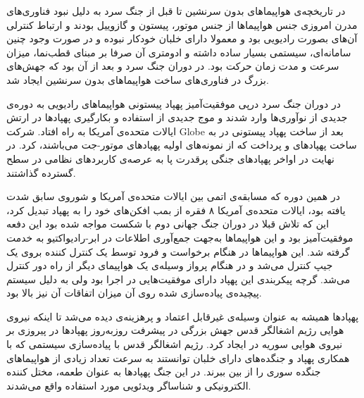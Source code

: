 
در تاریخچه‌ی هواپیماهای بدون سرنشین تا قبل از جنگ سرد به دلیل نبود فناوری‌های مدرن امروزی جنس هواپیماها از جنس موتور، پیستون و گازوییل بودند و ارتباط کنترلی آن‌های بصورت رادیویی بود و معمولا دارای خلبان خودکار نبوده و در صورت وجود چنین سامانه‌ای، سیستمی بسیار ساده داشته و ادومتری آن‌ صرفا بر مبنای قطب‌نما، میزان سرعت و مدت زمان حرکت بود. در دوران جنگ سرد و بعد از آن بود که جهش‌های بزرگ در فناوری‌های ساخت هواپیماهای بدون سرنشین ایجاد شد.

در دوران جنگ سرد درپی موفقیت‌آمیز پهپاد پیستونی  هواپیماهای رادیویی به دوره‌ی جدیدی از نوآوری‌ها وارد شدند و موج جدیدی از استفاده و بکارگیری پهپادها در ارتش ایالات متحده‌ی آمریکا به راه افتاد. شرکت Globe بعد از ساخت پهپاد پیستونی  در  به ساخت پهپادهای  و  پرداخت که از نمونه‌های اولیه پهپادهای موتور-جت می‌باشند، کرد. در نهایت در اواخر  پهپادهای جنگی پرقدرت پا به عرصه‌ی کاربردهای نظامی در سطح گسترده گذاشتند.


در همین دوره که مسابقه‌ی اتمی بین ایالات متحده‌ی آمریکا و شوروی سابق شدت یافته بود، ایالات متحده‌ی آمریکا ۸ فقره از بمب افکن‌های  خود را به پهپاد تبدیل کرد، این که تلاش قبلا در دوران جنگ جهانی دوم با شکست مواجه شده بود این دفعه موفقیت‌آمیز بود و این هواپیماها به‌جهت جمع‌آوری اطلاعات در ابر-رادیواکتیو به خدمت گرفته شد. این هواپیماها در هنگام برخواست و فرود توسط یک کنترل کننده بروی یک جیپ کنترل می‌شد و در هنگام پرواز وسیله‌‌ی یک هواپیمای  دیگر از راه دور کنترل می‌شد. گرچه پیکربندی این پهپاد دارای موفقیت‌هایی در اجرا بود ولی به دلیل سیستم پیچیده‌ی پیاده‌سازی شده روی آن میزان اتفاقات آن نیز بالا بود.

پهپادها همیشه به عنوان وسیله‌ی غیرقابل اعتماد و پرهزینه‌ی دیده می‌شد تا اینکه نیروی هوایی رژیم اشغالگر قدس جهش بزرگی در پیشرفت روزبه‌روز پهپاد‌ها در پیروزی بر نیروی هوایی سوریه در  ایجاد کرد. رژیم اشغالگر قدس با پیاده‌سازی سیستمی که با همکاری پهپاد و جنگده‌های دارای خلبان توانستند به سرعت تعداد زیادی از هواپیماهای جنگده سوری را از بین ببرند. در این جنگ پهپادها به عنوان طعمه‌، مختل کننده‌ الکترونیکی و شناساگر ویدئویی مورد استفاده واقع می‌شدند.

